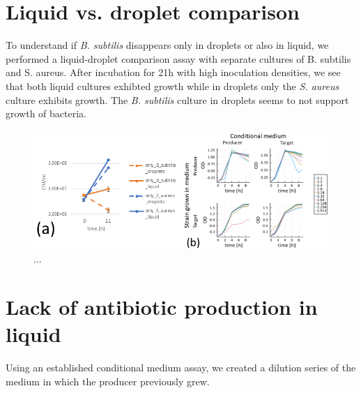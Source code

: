 \section{Liquid vs. droplet comparison}
To understand if \textit{B. subtilis} disappears only in droplets or also in liquid, we performed a liquid-droplet comparison assay with separate cultures of B. subtilis and S. aureus. After incubation for 21h with high inoculation densities, we see that both liquid cultures exhibted growth while in droplets only the \textit{S. aureus} culture exhibits growth. The \textit{B. subtilis} culture in droplets seems to not support growth of bacteria.

\begin{figure}
\centering
\includegraphics[width=\linewidth]{graphics/2025_09_28_droplets_fig6.png}
\caption{...}
\label{fig:results_liquid_vs_drop_supernatant}
\end{figure}

\section{Lack of antibiotic production in liquid}
Using an established conditional medium assay, we created a dilution series of the medium in which the producer previously grew. 